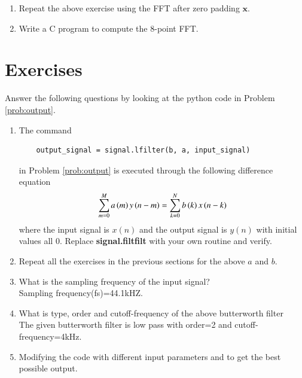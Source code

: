 \documentclass[journal,12pt,twocolumn]{IEEEtran}
\let\vec\mathbf
\renewcommand\thesection{\arabic{section}}
\begin{document}
\begin{enumerate}[label=\arabic*.,ref=\thesection.\theenumi]
\item Repeat the above exercise using the FFT
after zero padding $\vec{x}$.
\item Write a C program to compute the 8-point FFT. 
\end{enumerate}
\section{Exercises}
Answer the following questions by looking at the python code in Problem \ref{prob:output}.
\begin{enumerate}[label=\thesection.\arabic*]
\item
The command
\begin{lstlisting}
	output_signal = signal.lfilter(b, a, input_signal)
\end{lstlisting}
in Problem \ref{prob:output} is executed through the following difference equation
\begin{equation}
	\label{eq:iir_filter_gen}
	\sum _{m=0}^{M}a\left(m\right)y\left(n-m\right)=\sum _{k=0}^{N}b\left(k\right)x\left(n-k\right)
\end{equation}
%
where the input signal is $x(n)$ and the output signal is $y(n)$ with initial values all 0. Replace
\textbf{signal.filtfilt} with your own routine and verify.
%
\item Repeat all the exercises in the previous sections for the above $a$ and $b$.
\item What is the sampling frequency of the input signal?
\\
\solution
Sampling frequency(fs)=44.1kHZ.
\item
What is type, order and  cutoff-frequency of the above butterworth filter
\\
\solution
The given butterworth filter is low pass with order=2 and cutoff-frequency=4kHz.
%
\item
Modifying the code with different input parameters and to get the best possible output.
%
\end{enumerate}
\end{document}
